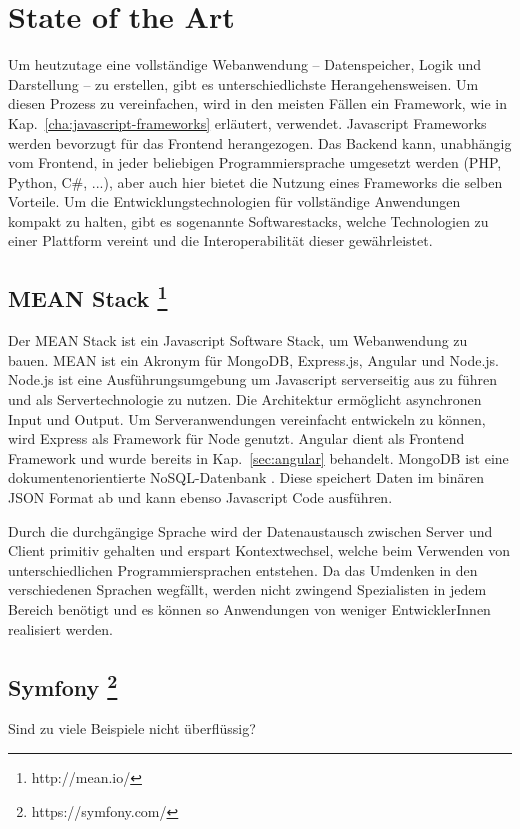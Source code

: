 \chapter{State of the Art}
\label{cha:StateOfTheArt}
Um heutzutage eine vollständige Webanwendung -- Datenspeicher, Logik und Darstellung -- zu erstellen, gibt es unterschiedlichste Herangehensweisen. Um diesen Prozess zu vereinfachen, wird in den meisten Fällen ein Framework, wie in Kap.~\ref{cha:javascript-frameworks} erläutert, verwendet. Javascript Frameworks werden bevorzugt für das Frontend herangezogen. Das Backend kann, unabhängig vom Frontend, in jeder beliebigen Programmiersprache umgesetzt werden (PHP, Python, C\#, ...), aber auch hier bietet die Nutzung eines Frameworks die selben Vorteile. Um die Entwicklungstechnologien für vollständige Anwendungen kompakt zu halten, gibt es sogenannte Softwarestacks, welche Technologien zu einer Plattform vereint und die Interoperabilität dieser gewährleistet.

\section%
{MEAN Stack%
	\protect\footnote{http://mean.io/}}%

Der MEAN Stack ist ein Javascript Software Stack, um Webanwendung zu bauen. MEAN ist ein Akronym für MongoDB, Express.js, Angular und Node.js. 
Node.js ist eine Ausführungsumgebung um Javascript serverseitig aus zu führen und als Servertechnologie zu nutzen. Die Architektur ermöglicht asynchronen Input und Output. Um Serveranwendungen vereinfacht entwickeln zu können, wird Express als Framework für Node genutzt. 
Angular dient als Frontend Framework und wurde bereits in Kap.~\ref{sec:angular} behandelt. MongoDB ist eine dokumentenorientierte NoSQL-Datenbank \cite{noSQL}. Diese speichert Daten im binären JSON Format ab und kann ebenso Javascript Code ausführen.

Durch die durchgängige Sprache wird der Datenaustausch zwischen Server und Client primitiv gehalten und erspart Kontextwechsel, welche beim Verwenden von unterschiedlichen Programmiersprachen entstehen. Da das Umdenken in den verschiedenen Sprachen wegfällt, werden nicht zwingend Spezialisten in jedem Bereich benötigt und es können so Anwendungen von weniger EntwicklerInnen realisiert werden. 

\section%
{Symfony%
	\protect\footnote{https://symfony.com/}}%

Sind zu viele Beispiele nicht überflüssig?
